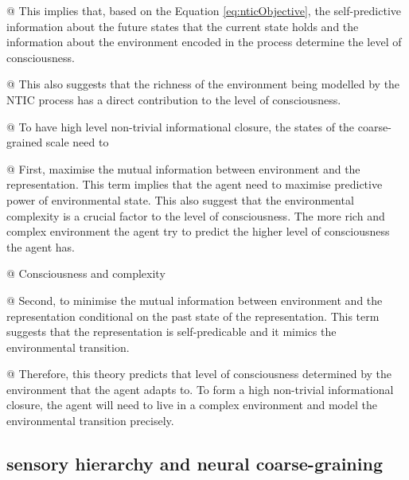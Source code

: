 \documentclass[utf8]{article}
\begin{document}
			\begin{WritingMaterials}
    			@ This implies that, based on the Equation \ref{eq:nticObjective}, the self-predictive information about the future states that the current state holds and the information about the environment encoded in the process determine the level of consciousness.
    			
    			@ This also suggests that the richness of the environment being modelled by the	NTIC process has a direct contribution to the level of consciousness.
    			

				@ To have high level non-trivial informational closure, the states of the coarse-grained scale need to

				@ First, maximise the mutual information between environment and the representation.
				This term implies that the agent need to maximise predictive power of environmental state. This also suggest that the environmental complexity is a crucial factor to the level of consciousness. The more rich and complex environment the agent try to predict the higher level of consciousness the agent has.
				
				@ Consciousness and complexity \cite{Tononi1998}


				@ Second, to minimise the mutual information between environment and the representation conditional on the past state of the representation. This term suggests that the representation is self-predicable and it mimics the environmental transition.

				@ Therefore, this theory predicts that level of consciousness determined by the environment that the agent adapts to. To form a high non-trivial informational closure, the agent will need to live in a complex environment and model the environmental transition precisely.


			\end{WritingMaterials}


\rlend    


		\subsection{sensory hierarchy and neural coarse-graining}\label{sec:SensoryHierarchy}
\end{document}
